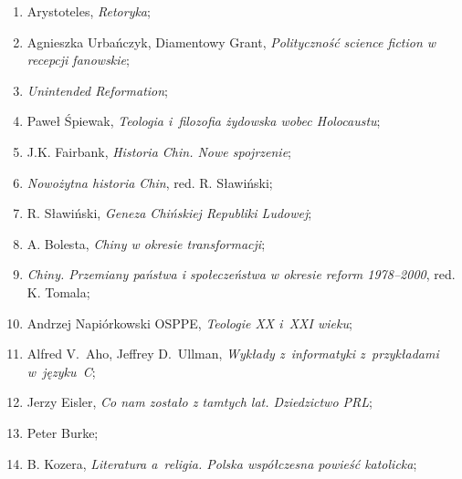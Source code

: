 \documentclass[a4paper,11pt]{article}
\begin{document}
\begin{enumerate}
\item Arystoteles, \textit{Retoryka};



\item Agnieszka Urbańczyk, Diamentowy Grant, \textit{Polityczność
    science fiction w recepcji fanowskie};



\item \textit{Unintended Reformation};




\item Paweł Śpiewak, \textit{Teologia i~filozofia żydowska wobec
    Holocaustu};



\item J.K. Fairbank, \textit{Historia Chin. Nowe spojrzenie};



\item \textit{Nowożytna historia Chin}, red. R. Sławiński;



\item R. Sławiński, \textit{Geneza Chińskiej Republiki Ludowej};



\item A. Bolesta, \textit{Chiny w okresie transformacji};



\item \textit{Chiny. Przemiany państwa i społeczeństwa w okresie reform
    1978--2000}, red. K. Tomala;



\item Andrzej Napiórkowski OSPPE, \textit{Teologie XX i~XXI wieku};



\item Alfred V.~Aho, Jeffrey D.~Ullman, \textit{Wykłady z~informatyki
    z~przykładami w~języku~C};



\item Jerzy Eisler, \textit{Co nam zostało z tamtych lat. Dziedzictwo
    PRL};



\item Peter Burke;



\item B. Kozera, \textit{Literatura a~religia. Polska współczesna
    powieść katolicka};




\end{enumerate}
\end{document}
